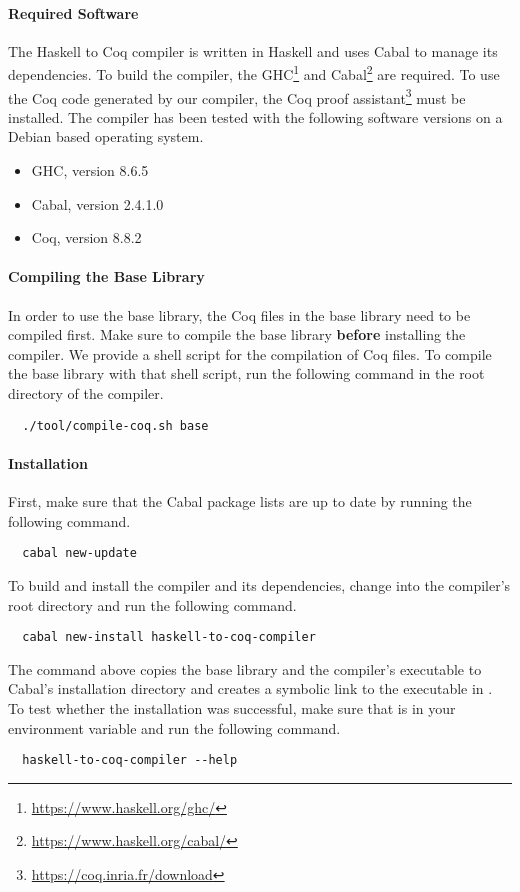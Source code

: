 \paragraph{Required Software}
The Haskell to Coq compiler is written in Haskell and uses Cabal to manage its dependencies.
To build the compiler, the GHC\footnote{\url{https://www.haskell.org/ghc/}} and Cabal\footnote{\url{https://www.haskell.org/cabal/}} are required.
To use the Coq code generated by our compiler, the Coq proof assistant\footnote{\url{https://coq.inria.fr/download}} must be installed.
The compiler has been tested with the following software versions on a Debian based operating system.
\begin{itemize}
  \item GHC, version 8.6.5
  \item Cabal, version 2.4.1.0
  \item Coq, version 8.8.2
\end{itemize}

\paragraph{Compiling the Base Library}
In order to use the base library, the Coq files in the base library need to be compiled first.
Make sure to compile the base library \textbf{before} installing the compiler.
We provide a shell script for the compilation of Coq files.
To compile the base library with that shell script, run the following command in the root directory of the compiler.
\begin{verbatim}
  ./tool/compile-coq.sh base
\end{verbatim}

\paragraph{Installation}
First, make sure that the Cabal package lists are up to date by running the following command.
\begin{verbatim}
  cabal new-update
\end{verbatim}
To build and install the compiler and its dependencies, change into the compiler's root directory and run the following command.
\begin{verbatim}
  cabal new-install haskell-to-coq-compiler
\end{verbatim}
The command above copies the base library and the compiler's executable to Cabal's installation directory and creates a symbolic link to the executable in .
To test whether the installation was successful, make sure that  is in your  environment variable and run the following command.
\begin{verbatim}
  haskell-to-coq-compiler --help
\end{verbatim}

